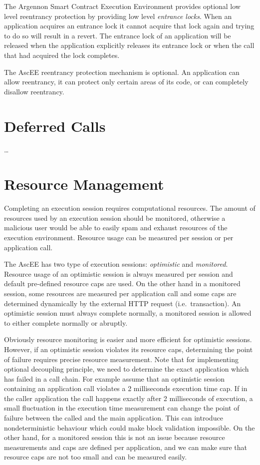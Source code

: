 The Argennon Smart Contract Execution Environment provides optional low level reentrancy protection by providing low
level \emph{entrance locks}. When an application acquires an entrance lock it cannot acquire that lock again and trying
to do so will result in a revert. The entrance lock of an application will be released when the application explicitly
releases its entrance lock or when the call that had acquired the lock completes.

The AscEE reentrancy protection mechanism is optional. An application can allow reentrancy, it can protect only certain
areas of its code, or can completely disallow reentrancy.


\section{Deferred Calls}\label{sec:deferred-calls}

\ldots


\section{Resource Management}\label{sec:res-man}

Completing an execution session requires computational resources. The amount of resources used by an execution session
should be monitored, otherwise a malicious user would be able to easily spam and exhaust resources of the execution
environment. Resource usage can be measured per session or per application call.

The AscEE has two type of execution sessions: \emph{optimistic} and \emph{monitored}. Resource usage of an optimistic
session is always measured per session and default pre-defined resource caps are used. On the other hand in a monitored
session, some resources are measured per application call and some
caps are determined dynamically by the external HTTP request (i.e.\ transaction). An optimistic session must always
complete normally, a monitored session is allowed to either complete normally or abruptly.

Obviously resource monitoring is easier and more efficient for optimistic sessions. However, if
an optimistic session violates its resource caps, determining the point of failure requires precise resource
measurement. Note that for implementing optional decoupling principle, we need to determine the exact application
which has failed in a call chain. For example assume that an optimistic session containing an application call
violates a 2 milliseconds execution time cap. If in the caller application the call happens exactly after 2
milliseconds of execution, a small fluctuation in the execution time measurement can
change the point of failure between the called and the main application. This can introduce nondeterministic
behaviour which could make block validation impossible. On the other hand, for a monitored session this is not an issue
because resource measurements and caps are defined per application, and we can make sure that resource caps are not too
small and can be measured easily.

